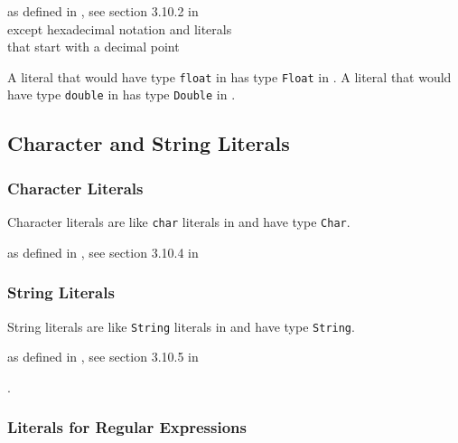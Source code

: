\begin{flushleft}
as defined in \java{}, see section 3.10.2 in \cite{langspec3}\\
\hspace{0.5in} except hexadecimal notation and literals\\
\hspace{0.5in} that start with a decimal point
\end{flushleft}

A literal that would have type \texttt{float} in \java{} has type \texttt{Float} in \frege{}. A literal that would have type \texttt{double} in \java{} has type \texttt{Double} in \frege{}.

\subsection{Character and String Literals}

\subsubsection{Character Literals}

Character literals are like \texttt{char} literals in \java{} and have type \texttt{Char}.

\begin{flushleft}
as defined in \java{}, see section 3.10.4 in \cite{langspec3}\\
\end{flushleft}


\subsubsection{String Literals}

String literals are like \texttt{String} literals in \java{} and have type \texttt{String}.

\begin{flushleft}
as defined in \java{}, see section 3.10.5 in \cite{langspec3}\\
\end{flushleft}

.

\subsubsection{Literals for Regular Expressions} \label{regexliteral}

